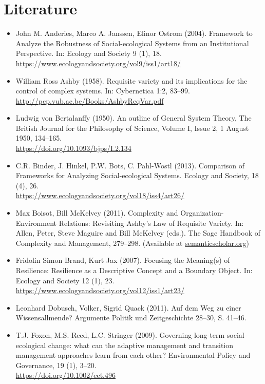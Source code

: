 \documentclass[11pt,a4paper]{article}
\begin{document}
\section{Literature}

\begin{itemize}
\item John M. Anderies, Marco A. Janssen, Elinor Ostrom (2004).  Framework to
  Analyze the Robustness of Social-ecological Systems from an Institutional
  Perspective. In: Ecology and Society 9 (1), 18.\\
  \url{https://www.ecologyandsociety.org/vol9/iss1/art18/}
\item William Ross Ashby (1958).  Requisite variety and its implications for
  the control of complex systems. In: Cybernetica 1:2, 83--99.\\
  \url{http://pcp.vub.ac.be/Books/AshbyReqVar.pdf}
\item Ludwig von Bertalanffy (1950). An outline of General System Theory,
  The British Journal for the Philosophy of Science, Volume I, Issue 2, 1
  August 1950, 134–165.\\ \url{https://doi.org/10.1093/bjps/I.2.134}
\item C.R. Binder, J. Hinkel, P.W. Bots, C. Pahl-Wostl (2013). Comparison of
  Frameworks for Analyzing Social-ecological Systems. Ecology and Society,
  18 (4), 26.\\ \url{https://www.ecologyandsociety.org/vol18/iss4/art26/}
\item Max Boisot, Bill McKelvey (2011). Complexity and
  Organization-Environment Relations: Revisiting Ashby’s Law of Requisite
  Variety. In: Allen, Peter, Steve Maguire and Bill McKelvey (eds.). The Sage
  Handbook of Complexity and Management, 279--298. (Available at
  \url{semanticscholar.org})
\item Fridolin Simon Brand, Kurt Jax (2007).  Focusing the Meaning(s) of
  Resilience: Resilience as a Descriptive Concept and a Boundary Object. In:
  Ecology and Society 12 (1), 23.
  \url{https://www.ecologyandsociety.org/vol12/iss1/art23/}
\item Leonhard Dobusch, Volker, Sigrid Quack (2011). Auf dem Weg zu einer
  Wissensallmende? Argumente Politik und Zeitgeschichte 28--30, S. 41--46.
\item T.J. Foxon, M.S. Reed, L.C. Stringer (2009). Governing long‐term
  social–ecological change: what can the adaptive management and transition
  management approaches learn from each other? Environmental Policy and
  Governance, 19 (1), 3--20.\\ \url{https://doi.org/10.1002/eet.496}

\end{itemize}
\end{document}
